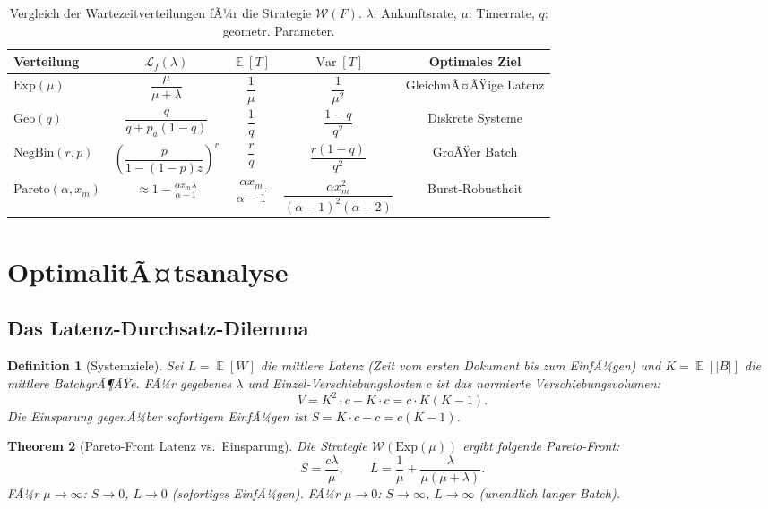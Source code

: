 ﻿\documentclass[12pt, a4paper]{article}
\newtheorem{theorem}{Theorem}[section]
\newtheorem{definition}[theorem]{Definition}
\DeclareMathOperator{\E}{\mathbb{E}}
\DeclareMathOperator{\Var}{Var}
\newcommand{\Geo}{\mathrm{Geo}}
\newcommand{\Exp}{\mathrm{Exp}}
\newcommand{\NBin}{\mathrm{NegBin}}
\newcommand{\Pareto}{\mathrm{Pareto}}
\begin{document}
\begin{table}[ht]
\centering
\caption{Vergleich der Wartezeitverteilungen fÃ¼r die Strategie $\mathcal{W}(F)$.
         $\lambda$: Ankunftsrate, $\mu$: Timerrate, $q$: geometr. Parameter.}
\label{tab:comparison}
\renewcommand{\arraystretch}{1.4}
\begin{tabular}{lcccc}
\toprule
\textbf{Verteilung} & $\mathcal{L}_f(\lambda)$ & $\E[T]$ & $\Var[T]$ &
  \textbf{Optimales Ziel}\\
\midrule
$\Exp(\mu)$
  & $\dfrac{\mu}{\mu+\lambda}$
  & $\dfrac{1}{\mu}$
  & $\dfrac{1}{\mu^2}$
  & GleichmÃ¤ÃŸige Latenz\\[6pt]
$\Geo(q)$
  & $\dfrac{q}{q + p_a(1-q)}$
  & $\dfrac{1}{q}$
  & $\dfrac{1-q}{q^2}$
  & Diskrete Systeme\\[6pt]
$\NBin(r,p)$
  & $\left(\dfrac{p}{1-(1-p)z}\right)^r$
  & $\dfrac{r}{q}$
  & $\dfrac{r(1-q)}{q^2}$
  & GroÃŸer Batch\\[6pt]
$\Pareto(\alpha, x_m)$
  & $\approx 1 - \frac{\alpha x_m\lambda}{\alpha-1}$
  & $\dfrac{\alpha x_m}{\alpha-1}$
  & $\dfrac{\alpha x_m^2}{(\alpha-1)^2(\alpha-2)}$
  & Burst-Robustheit\\[6pt]
\bottomrule
\end{tabular}
\end{table}

\section{OptimalitÃ¤tsanalyse}\label{sec:optimality}

\subsection{Das Latenz-Durchsatz-Dilemma}

\begin{definition}[Systemziele]\label{def:goals}
Sei $L = \E[W]$ die mittlere Latenz (Zeit vom ersten Dokument bis zum
EinfÃ¼gen) und $K = \E[|B|]$ die mittlere BatchgrÃ¶ÃŸe. FÃ¼r gegebenes $\lambda$
und Einzel-Verschiebungskosten $c$ ist das normierte Verschiebungsvolumen:
\[
  V = K^2 \cdot c - K \cdot c = c \cdot K(K-1).
\]
Die Einsparung gegenÃ¼ber sofortigem EinfÃ¼gen ist
$S = K \cdot c - c = c(K-1)$.
\end{definition}

\begin{theorem}[Pareto-Front Latenz vs.\ Einsparung]\label{thm:paretofront}
Die Strategie $\mathcal{W}(\Exp(\mu))$ ergibt folgende Pareto-Front:
\[
  S = \frac{c\lambda}{\mu}, \qquad L = \frac{1}{\mu} + \frac{\lambda}{\mu(\mu+\lambda)}.
\]
FÃ¼r $\mu \to \infty$: $S \to 0$, $L \to 0$ (sofortiges EinfÃ¼gen).
FÃ¼r $\mu \to 0$: $S \to \infty$, $L \to \infty$ (unendlich langer Batch).
\end{theorem}
\end{document}
